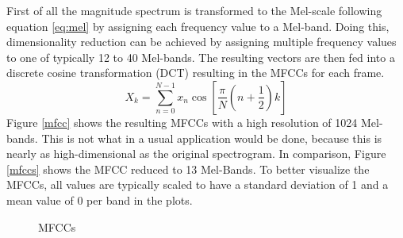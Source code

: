 \FloatBarrier
\noindent First of all the magnitude spectrum is transformed to the Mel-scale following equation \eqref{eq:mel} by assigning each frequency value to a Mel-band.
Doing this, dimensionality reduction can be achieved by assigning multiple frequency values to one of typically 12 to 40 Mel-bands. The resulting vectors are then fed into a discrete cosine transformation (DCT) resulting in the MFCCs for each frame. 
\begin{equation} \label{eq:dct}
X_k = \sum_{n=0}^{N-1}{x_n \cos\left[{\frac{\pi}{N}(n + \frac{1}{2})k}\right]}
\end{equation}
Figure \ref{mfcc} shows the resulting MFCCs with a high resolution of 1024 Mel-bands. This is not what in a usual application would be done, because this is nearly as high-dimensional as the original spectrogram. In comparison, Figure \ref{mfccs} shows the MFCC reduced to 13 Mel-Bands.
To better visualize the MFCCs, all values are typically scaled to have a standard deviation of 1 and a mean value of 0 per band in the plots. 
\begin{figure}[htbp]
	\centering
	\caption{MFCCs}	
	\label{fig:mfcc}
\end{figure}
